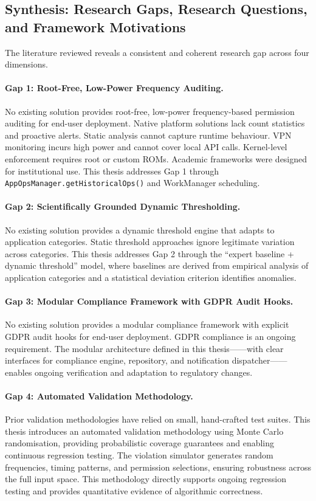 \subsection{Synthesis: Research Gaps, Research Questions, and Framework Motivations}

The literature reviewed reveals a consistent and coherent research gap across four dimensions.

\paragraph{Gap 1: Root-Free, Low-Power Frequency Auditing.} No existing solution provides root-free, low-power frequency-based permission auditing for end-user deployment. Native platform solutions lack count statistics and proactive alerts. Static analysis cannot capture runtime behaviour. VPN monitoring incurs high power and cannot cover local API calls. Kernel-level enforcement requires root or custom ROMs. Academic frameworks were designed for institutional use. This thesis addresses Gap 1 through \texttt{AppOpsManager.getHistoricalOps()} and WorkManager scheduling.

\paragraph{Gap 2: Scientifically Grounded Dynamic Thresholding.} No existing solution provides a dynamic threshold engine that adapts to application categories. Static threshold approaches ignore legitimate variation across categories. This thesis addresses Gap 2 through the ``expert baseline + dynamic threshold'' model, where baselines are derived from empirical analysis of application categories and a statistical deviation criterion identifies anomalies.

\paragraph{Gap 3: Modular Compliance Framework with GDPR Audit Hooks.} No existing solution provides a modular compliance framework with explicit GDPR audit hooks for end-user deployment. GDPR compliance is an ongoing requirement. The modular architecture defined in this thesis——with clear interfaces for compliance engine, repository, and notification dispatcher——enables ongoing verification and adaptation to regulatory changes.

\paragraph{Gap 4: Automated Validation Methodology.} Prior validation methodologies have relied on small, hand-crafted test suites. This thesis introduces an automated validation methodology using Monte Carlo randomisation, providing probabilistic coverage guarantees and enabling continuous regression testing. The violation simulator generates random frequencies, timing patterns, and permission selections, ensuring robustness across the full input space. This methodology directly supports ongoing regression testing and provides quantitative evidence of algorithmic correctness.

